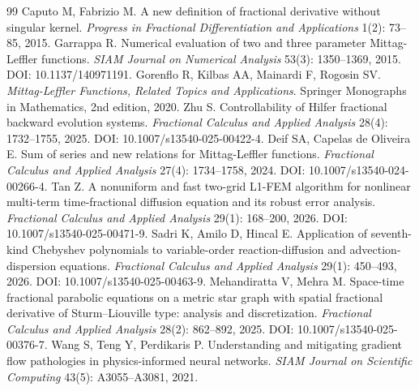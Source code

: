 \documentclass[11pt]{article}
\begin{document}
\begin{thebibliography}{99}
 Caputo M, Fabrizio M. A new definition of fractional derivative without singular kernel. \emph{Progress in Fractional Differentiation and Applications} 1(2): 73--85, 2015.
 Garrappa R. Numerical evaluation of two and three parameter Mittag-Leffler functions. \emph{SIAM Journal on Numerical Analysis} 53(3): 1350--1369, 2015. DOI: 10.1137/140971191.
 Gorenflo R, Kilbas AA, Mainardi F, Rogosin SV. \emph{Mittag-Leffler Functions, Related Topics and Applications}. Springer Monographs in Mathematics, 2nd edition, 2020.
 Zhu S. Controllability of Hilfer fractional backward evolution systems. \emph{Fractional Calculus and Applied Analysis} 28(4): 1732--1755, 2025. DOI: 10.1007/s13540-025-00422-4.
 Deif SA, Capelas de Oliveira E. Sum of series and new relations for Mittag-Leffler functions. \emph{Fractional Calculus and Applied Analysis} 27(4): 1734--1758, 2024. DOI: 10.1007/s13540-024-00266-4.
 Tan Z. A nonuniform and fast two-grid L1-FEM algorithm for nonlinear multi-term time-fractional diffusion equation and its robust error analysis. \emph{Fractional Calculus and Applied Analysis} 29(1): 168--200, 2026. DOI: 10.1007/s13540-025-00471-9.
 Sadri K, Amilo D, Hincal E. Application of seventh-kind Chebyshev polynomials to variable-order reaction-diffusion and advection-dispersion equations. \emph{Fractional Calculus and Applied Analysis} 29(1): 450--493, 2026. DOI: 10.1007/s13540-025-00463-9.
 Mehandiratta V, Mehra M. Space-time fractional parabolic equations on a metric star graph with spatial fractional derivative of Sturm--Liouville type: analysis and discretization. \emph{Fractional Calculus and Applied Analysis} 28(2): 862--892, 2025. DOI: 10.1007/s13540-025-00376-7.
 Wang S, Teng Y, Perdikaris P. Understanding and mitigating gradient flow pathologies in physics-informed neural networks. \emph{SIAM Journal on Scientific Computing} 43(5): A3055--A3081, 2021.
\end{thebibliography}
\end{document}
